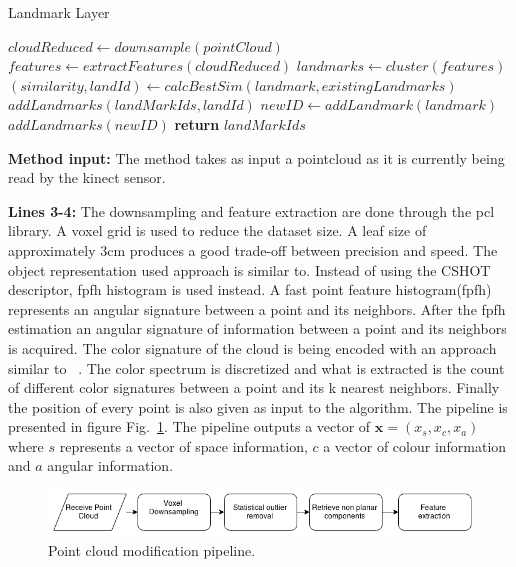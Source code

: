 \documentclass[twoside,hidelinks]{article}
\begin{document}
\begin{algorithm}
  \caption{Landmark Layer}\label{euclid}
  \begin{algorithmic}[1]
      \State $cloudReduced \gets downsample(pointCloud)$ 
      \State $features \gets extractFeatures(cloudReduced)$
      \State $landmarks \gets cluster(features)$  
	      \State $ (similarity, landId) \gets calcBestSim(landmark, existingLandmarks) $
			   \State $ addLandmarks(landMarkIds, landId)$
			\Else 
               \State $ newID \gets addLandmark(landmark)$
			   \State $addLandmarks(newID)$
			\EndIf
      \EndFor
      \State \textbf{return} $ landMarkIds$
    \EndProcedure
  \end{algorithmic}
\end{algorithm}


\textbf{Method input:} The method takes as input a pointcloud as it is currently being read by the kinect sensor.

\textbf{Lines 3-4:} The downsampling and feature extraction are done through the pcl\cite{pcl} library. A voxel grid is used to reduce the dataset size. A leaf size of approximately 3cm produces a good trade-off between precision and speed. The object representation used approach is similar to\cite{objectpointslam}. Instead of using the CSHOT descriptor, fpfh\cite{fpfh} histogram is used instead. A fast point feature histogram(fpfh) represents an angular signature between a point and its neighbors. After the fpfh estimation an angular signature of information between a point and its neighbors is acquired. The color signature of the cloud is being encoded with an approach similar to ~\cite{smcddp}. The color spectrum is discretized and what is extracted is the count of different color signatures between a point and its k nearest neighbors. Finally the position of every point is also given as input to the algorithm. The pipeline is presented in figure Fig.~\ref{pcl:mod}. The pipeline outputs a vector of $ \textbf{x} = (x_s, x_c, x_a) $  where $s$ represents a vector of space information, $c$ a vector of colour information and $a$ angular information. 

\begin{figure}[ht!]
  \centering
    \includegraphics[width=1\textwidth]{Basic}
  \caption{Point cloud modification pipeline.}
  \label{pcl:mod}
\end{figure}
\end{document}
